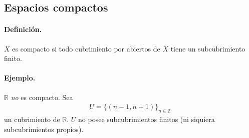 













\subsection{Espacios compactos}

\paragraph{\textbf{Definición.}}
$X$ es compacto si todo cubrimiento por abiertos de $X$ tiene un subcubrimiento finito.

\paragraph{\textbf{Ejemplo.}}
$\mathbb R$ \emph{no} es compacto. Sea
\begin{align*}
U=\bigl\{(n-1,n+1)\bigr\}_{n\in\mathbb Z}
\end{align*}
un cubrimiento de $\mathbb R$.  
$U$ no posee subcubrimientos finitos (ni siquiera subcubrimientos propios).


